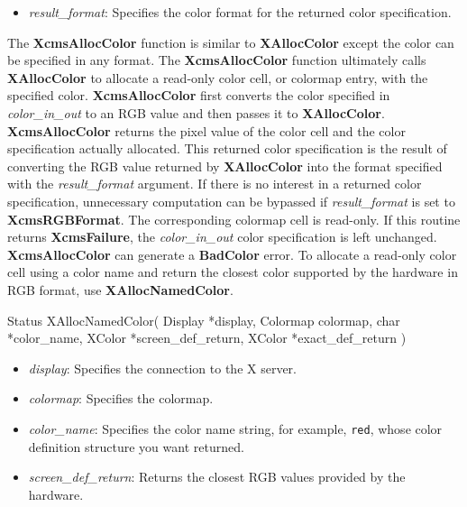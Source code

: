 \documentclass{report}
\begin{document}
\begin{itemize}
\begin{itemize}
                \item \textit{result\_format}: Specifies the color format for the returned color specification.
            \end{itemize}
            \noindent
            The \textbf{XcmsAllocColor} function is similar to \textbf{XAllocColor} except the color can be specified in any format. The \textbf{XcmsAllocColor} function ultimately calls \textbf{XAllocColor} to allocate a read-only color cell, or colormap entry, with the specified color. \textbf{XcmsAllocColor} first converts the color specified in \textit{color\_in\_out} to an RGB value and then passes it to \textbf{XAllocColor}. \textbf{XcmsAllocColor} returns the pixel value of the color cell and the color specification actually allocated. This returned color specification is the result of converting the RGB value returned by \textbf{XAllocColor} into the format specified with the \textit{result\_format} argument. If there is no interest in a returned color specification, unnecessary computation can be bypassed if \textit{result\_format} is set to \textbf{XcmsRGBFormat}. The corresponding colormap cell is read-only. If this routine returns \textbf{XcmsFailure}, the \textit{color\_in\_out} color specification is left unchanged.
            \bigbreak \noindent
            \textbf{XcmsAllocColor} can generate a \textbf{BadColor} error.
            \bigbreak \noindent
            To allocate a read-only color cell using a color name and return the closest color supported by the hardware in RGB format, use \textbf{XAllocNamedColor}.
            \bigbreak \noindent 
            \begin{cppcode}
                Status XAllocNamedColor(
                    Display *display,
                    Colormap colormap,
                    char *color_name,
                    XColor *screen_def_return,
                    XColor *exact_def_return
                )
            \end{cppcode}
            \begin{itemize}
                \item \textit{display}: Specifies the connection to the X server.
                \item \textit{colormap}: Specifies the colormap.
                \item \textit{color\_name}: Specifies the color name string, for example, \texttt{red}, whose color definition structure you want returned.
                \item \textit{screen\_def\_return}: Returns the closest RGB values provided by the hardware.

\end{itemize}
\end{itemize}
\end{document}
